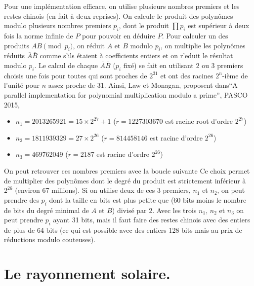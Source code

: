 \documentclass[a4paper,11pt]{article}
\begin{document}
\begin{giacjshere}
Pour une impl\'ementation efficace, on utilise plusieurs nombres
premiers et les restes chinois (en fait \`a deux reprises). 
On calcule le produit des polyn\^omes
modulo plusieurs nombres premiers $p_i$, dont le produit $\prod
p_i$  est sup\'erieur \`a deux fois la norme infinie de $P$ pour
pouvoir en d\'eduire $P$.
Pour calculer un des produits $AB \pmod {p_i}$, on r\'eduit $A$ et $B$ modulo $p_i$,
on multiplie les polyn\^omes r\'eduits $\overline{A} \overline{B}$ 
comme s'ils \'etaient \`a coefficients
entiers et on r'eduit le r\'esultat modulo $p_i$. 
Le calcul de chaque $\overline{A}\overline{B}$ ($p_i$ fix\'e) se fait en utilisant 2 ou 3
premiers choisis une fois pour toutes qui sont proches de $2^{31}$
et ont des racines $2^n$-i\`eme de l'unit\'e pour $n$ assez proche de 31.
Ainsi, Law et Monagan, proposent 
dans``A parallel implementation for polynomial multiplication
modulo a prime'',  PASCO 2015,
\begin{itemize}
\item $n_1 = 2013265921 =15 \times 2^{27}+1$ 
($r=1227303670$ est racine root d'ordre $2^{27}$)
\item
  $n_2 = 1811939329 =27 \times 2^{26}$ ($r=814458146$ est racine d'ordre $2^{26}$) 
\item $n_3 = 469762049 $ ($r=2187$ est racine d'ordre $2^{26}$)
\end{itemize}
On peut retrouver ces nombres premiers avec la boucle suivante
Ce choix permet de multiplier des polyn\^omes dont le degr\'e du produit
est strictement inf\'erieur \`a $2^{26}$ (environ 67 millions). Si on utilise deux de ces 3
premiers, $n_1$ et $n_2$, on peut prendre des $p_i$ dont la taille en bits est
plus petite que (60 bits moins le nombre de bits du degr\'e minimal de
$A$ et $B$) divis\'e par 2. Avec les trois $n_1$, $n_2$ et $n_3$ on peut prendre
$p_i$ ayant 31 bits, mais il faut faire des restes chinois avec des
entiers de plus de 64 bits (ce qui est possible avec des entiers 128
bits mais au prix de r\'eductions modulo couteuses).

\section{Le rayonnement solaire.} \label{sec:soleil}


\end{giacjshere}
\end{document}
